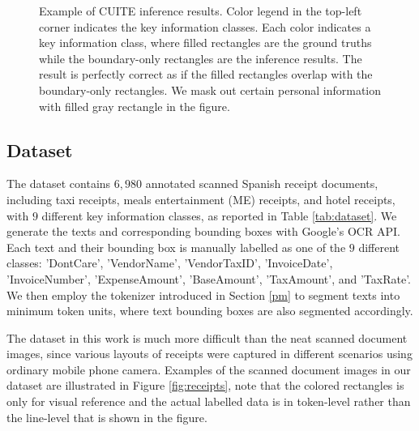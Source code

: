 \documentclass[10pt,twocolumn,letterpaper]{article}
\begin{document}
\begin{figure}
\begin{center}
\end{center}
   \caption{Example of CUITE inference results. Color legend in the top-left corner indicates the key information classes. Each color indicates a key information class, where filled rectangles are the ground truths while the boundary-only rectangles are the inference results. The result is perfectly correct as if the filled rectangles overlap with the boundary-only rectangles. We mask out certain personal information with filled gray rectangle in the figure.}
\label{fig:result}
\end{figure}

\subsection{Dataset}
The dataset contains $6,980$ annotated scanned Spanish receipt documents, including taxi receipts, meals entertainment (ME) receipts, and hotel receipts, with $9$ different key information classes, as reported in Table \ref{tab:dataset}. We generate the texts and corresponding bounding boxes with Google's OCR API. Each text and their bounding box is manually labelled as one of the $9$ different classes: 'DontCare', 'VendorName', 'VendorTaxID', 'InvoiceDate', 'InvoiceNumber', 'ExpenseAmount', 'BaseAmount', 'TaxAmount', and 'TaxRate'. We then employ the tokenizer introduced in Section \ref{pm} to segment texts into minimum token units, where text bounding boxes are also segmented accordingly. 

The dataset in this work is much more difficult than the neat scanned document images, since various layouts of receipts were captured in different scenarios using ordinary mobile phone camera. Examples of the scanned document images in our dataset are illustrated in Figure \ref{fig:receipts}, note that the colored rectangles is only for visual reference and the actual labelled data is in token-level rather than the line-level that is shown in the figure.
\end{document}
